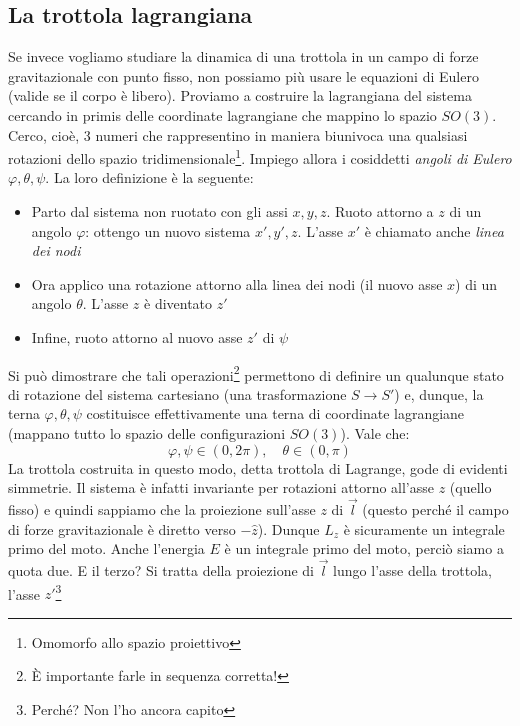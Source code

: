 \documentclass[a4paper,openany]{article}
\begin{document}
	\subsection{La trottola lagrangiana}
	Se invece vogliamo studiare la dinamica di una trottola in un campo di forze gravitazionale con punto fisso, non possiamo più usare le equazioni di Eulero (valide se il corpo è libero). Proviamo a costruire la lagrangiana del sistema cercando in primis delle coordinate lagrangiane che mappino lo spazio $SO(3)$. Cerco, cioè, 3 numeri che rappresentino in maniera biunivoca una qualsiasi rotazioni dello spazio tridimensionale\footnote{Omomorfo allo spazio proiettivo}. Impiego allora i cosiddetti \textit{angoli di Eulero} $\varphi,\theta,\psi$. La loro definizione è la seguente:
	\begin{itemize}
		\item Parto dal sistema non ruotato con gli assi $x,y,z$. Ruoto attorno a $z$ di un angolo $\varphi$: ottengo un nuovo sistema $x',y',z$. L'asse $x'$ è chiamato anche \textit{linea dei nodi}
		\item Ora applico una rotazione attorno alla linea dei nodi (il nuovo asse $x$) di un angolo $\theta$. L'asse $z$ è diventato $z'$
		\item Infine, ruoto attorno al nuovo asse $z'$ di $\psi$
	\end{itemize}
	Si può dimostrare che tali operazioni\footnote{È importante farle in sequenza corretta!} permettono di definire un qualunque stato di rotazione del sistema cartesiano (una trasformazione $S\rightarrow S'$) e, dunque, la terna $\varphi,\theta,\psi$ costituisce effettivamente una terna di coordinate lagrangiane (mappano tutto lo spazio delle configurazioni $SO(3)$). Vale che:
	$$
	\varphi, \psi \in (0,2\pi), \quad 	\theta \in (0,\pi)
	$$
	La trottola costruita in questo modo, detta trottola di Lagrange, gode di evidenti simmetrie. Il sistema è infatti invariante per rotazioni attorno all'asse $z$ (quello fisso) e quindi sappiamo che la proiezione sull'asse $z$ di $\vec{l}$ (questo perché il campo di forze gravitazionale è diretto verso $-\hat{z}$). Dunque $L_z$ è sicuramente un integrale primo del moto. Anche l'energia $E$ è un integrale primo del moto, perciò siamo a quota due. E il terzo? Si tratta della proiezione di $\vec{l}$ lungo l'asse della trottola, l'asse $z'$\footnote{Perché? Non l'ho ancora capito}
	
\end{document}
